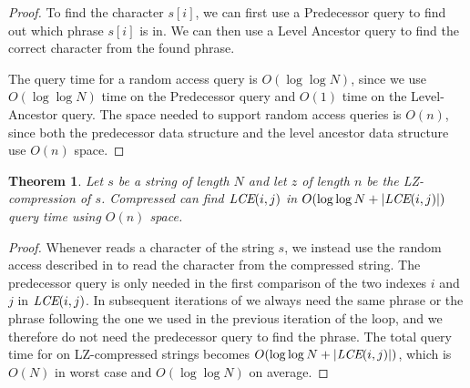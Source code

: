 \documentclass[a4]{article}
\newcommand*{\pref}{\prettyref}
\newtheorem{theorem}{Theorem}
\begin{document}
\begin{proof}
To find the character $s[i]$, we can first use a Predecessor query to find out which phrase $s[i]$ is in. We can then use a Level Ancestor query to find the correct character from the found phrase.



The query time for a random access query is $O(\log\log N)$, since we use $O(\log\log N)$ time on the Predecessor query and $O(1)$ time on the Level-Ancestor query. The space needed to support random access queries is $O(n)$, since both the predecessor data structure and the level ancestor data structure use $O(n)$ space.
\end{proof}

\begin{theorem}
Let $s$ be a string of length $N$ and let $z$ of length $n$ be the LZ-compression of $s$. Compressed  can find $\textit{LCE}(i,j)$ in $O(\log\log N + |\textit{LCE}(i,j)|)$ query time using $O(n)$ space.
\end{theorem}

\begin{proof}
Whenever  reads a character of the string $s$, we instead use the random access described in \pref{lem:lz-random-access} to read the character from the compressed string. The predecessor query is only needed in the first comparison of the two indexes $i$ and $j$ in $\textit{LCE}(i,j)$. In subsequent iterations of  we always need the same phrase or the phrase following the one we used in the previous iteration of the loop, and we therefore do not need the predecessor query to find the phrase. The total query time for  on LZ-compressed strings becomes $O(\log\log N + |\textit{LCE}(i,j)|)$, which is $O(N)$ in worst case and $O(\log \log N)$ on average.
\end{proof}
\end{document}
